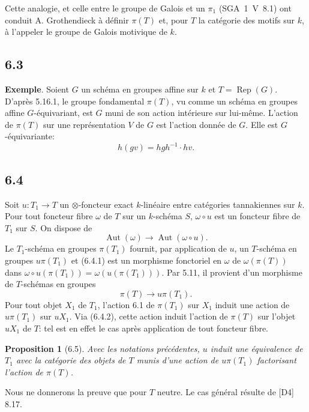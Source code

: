 \documentclass[12pt,a4paper]{article}
\theoremstyle{plain}
\newtheorem{proposition}[theorem]{Proposition}
\theoremstyle{definition}
\theoremstyle{remark}
\DeclareMathOperator{\Aut}{Aut}
\DeclareMathOperator{\Rep}{Rep}
\begin{document}
Cette analogie, et celle entre le groupe de Galois et un $\pi_1$ (SGA~1~V~8.1) ont conduit A. Grothendieck à définir $\pi(T)$ et, pour $T$ la catégorie des motifs sur $k$, à l'appeler le groupe de Galois motivique de $k$.

\subsection*{6.3}
\textbf{Exemple}. Soient $G$ un schéma en groupes affine sur $k$ et $T = 
\Rep(G)$. D'après 5.16.1, le groupe fondamental $\pi(T)$, vu comme un schéma en groupes affine $G$-équivariant, est $G$ muni de son action intérieure sur lui-même. L'action de $\pi(T)$ sur une représentation $V$ de $G$ est l'action donnée de $G$. Elle est $G$-équivariante:
\[
h(gv) = hgh^{-1} 
\cdot hv.
\]

\subsection*{6.4}
Soit $u: T_1 
\to T$ un $\otimes$-foncteur exact $k$-linéaire entre catégories tannakiennes sur $k$. Pour tout foncteur fibre $\omega$ de $T$ sur un $k$-schéma $S$, $\omega 
\circ u$ est un foncteur fibre de $T_1$ sur $S$. On dispose de
\begin{equation*}\tag{6.4.1}
\Aut(\omega) 
\longrightarrow 
\Aut(\omega 
\circ u).
\end{equation*}
Le $T_1$-schéma en groupes $\pi(T_1)$ fournit, par application de $u$, un $T$-schéma en groupes $u\pi(T_1)$ et (6.4.1) est un morphisme fonctoriel en $\omega$ de $\omega(\pi(T))$ dans $\omega 
\circ u(\pi(T_1)) = 
\omega(u(\pi(T_1)))$. Par 5.11, il provient d'un morphisme de $T$-schémas en groupes
\begin{equation*}\tag{6.4.2}
\pi(T) 
\longrightarrow u\pi(T_1).
\end{equation*}
Pour tout objet $X_1$ de $T_1$, l'action 6.1 de $\pi(T_1)$ sur $X_1$ induit une action de $u\pi(T_1)$ sur $uX_1$. Via (6.4.2), cette action induit l'action de $\pi(T)$ sur l'objet $uX_1$ de $T$: tel est en effet le cas après application de tout foncteur fibre.

\begin{proposition}[6.5]\label{prop:6.5}
Avec les notations précédentes, $u$ induit une équivalence de $T_1$ avec la catégorie des objets de $T$ munis d'une action de $u\pi(T_1)$ factorisant l'action de $\pi(T)$.
\end{proposition}

Nous ne donnerons la preuve que pour $T$ neutre. Le cas général résulte de [D4] 8.17.
\end{document}
